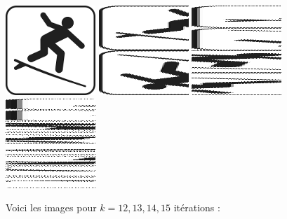 \documentclass[11pt,class=report,crop=false]{standalone}
\begin{document}
\begin{cours}
\begin{center}
\includegraphics[scale=\myscale,scale=0.65]{images_fiche/surf_gimp_new_boul_0.png}\qquad
\includegraphics[scale=\myscale,scale=0.65]{images_fiche/surf_gimp_new_boul_1.png}\qquad
\includegraphics[scale=\myscale,scale=0.65]{images_fiche/surf_gimp_new_boul_2.png}\qquad
\includegraphics[scale=\myscale,scale=0.65]{images_fiche/surf_gimp_new_boul_3.png}
\end{center}


Voici les images pour $k=12,13,14,15$ itérations :


\end{cours}
\end{document}
